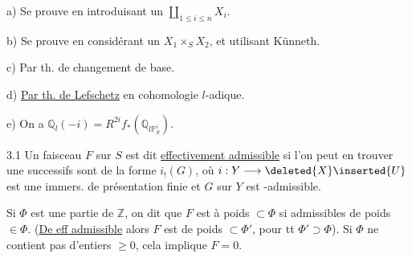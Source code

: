 a) Se prouve en introduisant un $\coprod_{1\leq i\leq n}X_i$.

b) Se prouve en considérant un $X_1\times_S X_2$, et utilisant Künneth.

c) Par th. de changement de base.

d) \uline{Par th. de Lefschetz} en cohomologie $l$-adique.


e) On  a $\mathbb Q_l(-i)=R^{2i}f_*(\mathbb Q_{l\mathbb P^i_S})$.


3.1 Un faisceau $F$ sur $S$ est dit \uline{effectivement admissible} si  l'on peut en trouver une   successifs sont de la forme $i_!(G)$, où $i:Y\longrightarrow \deleted{X}\inserted{U}$ est une immers. de présentation finie et $G$ sur  $Y$ est   -admissible.


 Si $\Phi$ est une partie de $\mathbb Z$, on dit que $F$ est à poids $\subset\Phi$ si   admissibles de poids $\in\Phi$. (\uline{De eff admissible} alors $F$ est de poids $\subset\Phi'$, pour tt $\Phi'\supset\Phi$). Si   $\Phi$ ne contient pas d'entiers $\geq0$, cela implique $F=0$.

